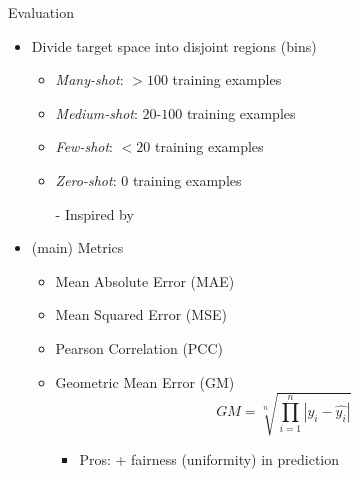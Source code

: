 \begin{frame}{Evaluation}
	\begin{itemize}\setlength\itemsep{1.5em}
		\item<2-> Divide target space into disjoint regions (bins)
		\begin{itemize}
			\item \emph{Many-shot}: $>100$ training examples
			\item \emph{Medium-shot}: $20$-$100$ training examples
			\item \emph{Few-shot}: $<20$ training examples
			\item \emph{Zero-shot}: $0$ training examples
			\item[-] Inspired by \cite{liu2019large}
		\end{itemize}
		\item<3-> (main) Metrics
		\begin{itemize}
			\item Mean Absolute Error (MAE)
			\item Mean Squared Error (MSE)
			\item Pearson Correlation (PCC)
			\item Geometric Mean Error (GM)
			\begin{equation*}
				GM = \sqrt[n]{\prod_{i=1}^n |y_i - \hat{y_i}|}
			\end{equation*}
			\begin{itemize}
				\item Pros: + fairness (uniformity) in prediction
			\end{itemize}
		\end{itemize}
	\end{itemize}
\end{frame}